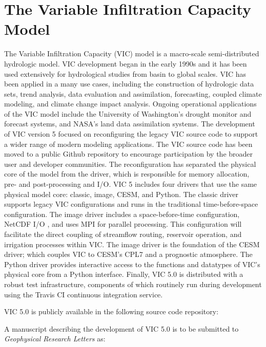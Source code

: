 \section{The Variable Infiltration Capacity Model}
\label{sec:vic_dev}
The Variable Infiltration Capacity (VIC) model is a macro-scale semi-distributed hydrologic model.
VIC development began in the early 1990s and it has been used extensively for hydrological studies from basin to global scales.
VIC has been applied in a many use cases, including the construction of hydrologic data sets, trend analysis, data evaluation and assimilation, forecasting, coupled climate modeling, and climate change impact analysis.
Ongoing operational applications of the VIC model include the University of Washington's drought monitor and forecast systems, and NASA's land data assimilation systems.
The development of VIC version 5 focused on reconfiguring the legacy VIC source code to support a wider range of modern modeling applications.
The VIC source code has been moved to a public Github repository to encourage participation by the broader user and developer communities.
The reconfiguration has separated the physical core of the model from the driver, which is responsible for memory allocation, pre- and post-processing and I/O.
VIC 5 includes four drivers that use the same physical model core: classic, image, CESM, and Python.
The classic driver supports legacy VIC configurations and runs in the traditional time-before-space configuration.
The image driver includes a space-before-time configuration, NetCDF I/O \citep{Rew_1990}, and uses MPI for parallel processing.
This configuration will facilitate the direct coupling of streamflow routing, reservoir operation, and irrigation processes within VIC.
The image driver is the foundation of the CESM driver; which couples VIC to CESM's CPL7 \citep{Craig_2012} and a prognostic atmosphere.
The Python driver provides interactive access to the functions and datatypes of VIC's physical core from a Python interface.
Finally, VIC 5.0 is distributed with a robust test infrastructure, components of which routinely run during development using the Travis CI continuous integration service.

VIC 5.0 is publicly available in the following source code repository:


A manuscript describing the development of VIC 5.0 is to be submitted to \textit{Geophysical Research Letters} as:


